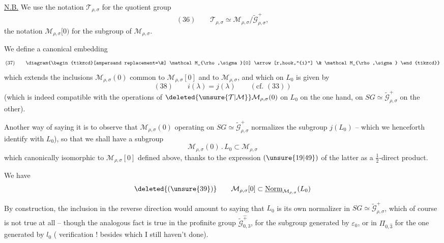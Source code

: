 \uline{N.B.} We use the notation $\mathcal T_{\rho,\sigma}$ for the
quotient group
\[
(36)\qquad \mathcal T_{\rho,\sigma}\simeq
\mathcal M_{\rho,\sigma}/\widetilde{\mathcal G}_{\rho,\sigma}^{+},
\]
the notation $\mathcal M_{\rho,\sigma}[0)$ for the subgroup
of $\mathcal M_{\rho,\sigma}$.

We define a canonical embedding
\[
(37)\qquad
\diagram{\begin{tikzcd}[ampersand replacement=\&]
\mathcal M_{\rho,\sigma}[0] \arrow[r,hook,"{i}"] \& \mathcal M_{\rho,\sigma}
\end{tikzcd}}
\]
which extends the inclusions 
$\mathcal M_{\rho,\sigma}(0)$ common to $\mathcal M_{\rho,\sigma}[0]$
and to $\mathcal M_{\rho,\sigma}$,
and which on $L_0$ is given by
\[
(38)\qquad i(\lambda)=j(\lambda)\qquad (\text{cf. }(33))
\]
(which is indeed compatible with the operations of
$\deleted{\unsure{\mathcal T|\mathcal M}}\mathcal M_{\rho,\sigma}(0)$
on $L_0$ on the one hand, on $SG\simeq\widetilde{\mathcal G}_{\rho,\sigma}^{+}$
on the other).

\par{}


Another way of saying it is to observe that
$\mathcal M_{\rho,\sigma}(0)$ operating on
$SG\simeq\widetilde{\mathcal G}_{\rho,\sigma}^{+}$
normalizes the subgroup $j(L_0)$ -- which we
henceforth identify with $L_0$), so that we
shall have a subgroup
\[
\mathcal M_{\rho,\sigma}(0)\mathbin{.}L_0\subset\mathcal M_{\rho,\sigma}
\]
which  canonically isomorphic to $\mathcal M_{\rho,\sigma}[0]$
defined above, thanks to the expression $(\unsure{19|49})$ of
the latter as a $\frac12$-direct product.

 We have
\[
\deleted{(\unsure{39})}\qquad
\mathcal M_{\rho,\sigma}[0]\subset
\underline{\operatorname{Norm}}_{\mathcal M_{\rho,\sigma}}(L_0)
\]

By construction, 
the inclusion in the reverse direction would amount to saying that $L_0$
is its own normalizer in $SG\simeq\widetilde{\mathcal G}_{\rho,\sigma}^{+}$,
which of course is not true at all
--  though the analogous fact is true
in the profinite group
$\widetilde{\mathcal G}_{0,3}^{\widehat{+}}$,
for the subgroup generated by $\varepsilon_0$,
or in $\Pi_{0,\widehat{3}}$ for
the one generated by $l_0$ ( verification !
besides which I still haven't done).

